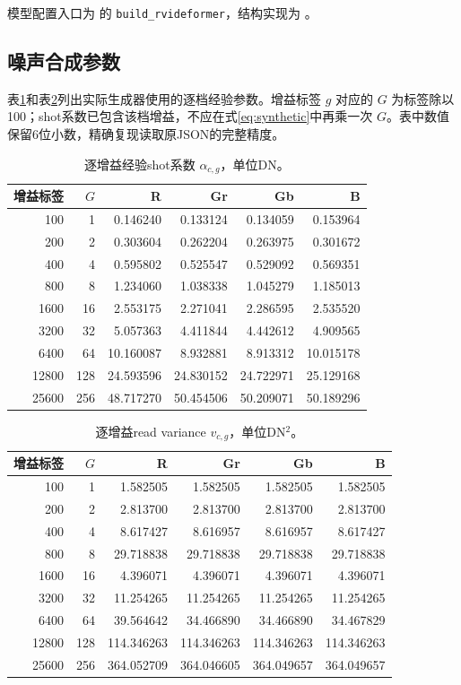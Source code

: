 \documentclass[11pt,a4paper,UTF8,fontset=fandol]{ctexart}
\begin{document}
模型配置入口为  的 \texttt{build\_rvideformer}，结构实现为 。

\subsection{噪声合成参数}

表\ref{tab:shot}和表\ref{tab:read}列出实际生成器使用的逐档经验参数。增益标签 $g$ 对应的 $G$ 为标签除以100；shot系数已包含该档增益，不应在式\eqref{eq:synthetic}中再乘一次 $G$。表中数值保留6位小数，精确复现读取原JSON的完整精度。

\begin{table}[H]
\centering\small
\caption{逐增益经验shot系数 $\alpha_{c,g}$，单位DN。}
\label{tab:shot}
\begin{tabular}{rrrrrr}
\toprule
增益标签 & $G$ & R & Gr & Gb & B \\
\midrule
100 & 1 & 0.146240 & 0.133124 & 0.134059 & 0.153964 \\
200 & 2 & 0.303604 & 0.262204 & 0.263975 & 0.301672 \\
400 & 4 & 0.595802 & 0.525547 & 0.529092 & 0.569351 \\
800 & 8 & 1.234060 & 1.038338 & 1.045279 & 1.185013 \\
1600 & 16 & 2.553175 & 2.271041 & 2.286595 & 2.535520 \\
3200 & 32 & 5.057363 & 4.411844 & 4.442612 & 4.909565 \\
6400 & 64 & 10.160087 & 8.932881 & 8.913312 & 10.015178 \\
12800 & 128 & 24.593596 & 24.830152 & 24.722971 & 25.129168 \\
25600 & 256 & 48.717270 & 50.454506 & 50.209071 & 50.189296 \\
\bottomrule
\end{tabular}
\end{table}

\begin{table}[H]
\centering\small
\caption{逐增益read variance $v_{c,g}$，单位DN$^2$。}
\label{tab:read}
\begin{tabular}{rrrrrr}
\toprule
增益标签 & $G$ & R & Gr & Gb & B \\
\midrule
100 & 1 & 1.582505 & 1.582505 & 1.582505 & 1.582505 \\
200 & 2 & 2.813700 & 2.813700 & 2.813700 & 2.813700 \\
400 & 4 & 8.617427 & 8.616957 & 8.616957 & 8.617427 \\
800 & 8 & 29.718838 & 29.718838 & 29.718838 & 29.718838 \\
1600 & 16 & 4.396071 & 4.396071 & 4.396071 & 4.396071 \\
3200 & 32 & 11.254265 & 11.254265 & 11.254265 & 11.254265 \\
6400 & 64 & 39.564642 & 34.466890 & 34.466890 & 34.467829 \\
12800 & 128 & 114.346263 & 114.346263 & 114.346263 & 114.346263 \\
25600 & 256 & 364.052709 & 364.046605 & 364.049657 & 364.049657 \\
\bottomrule
\end{tabular}
\end{table}
\end{document}
